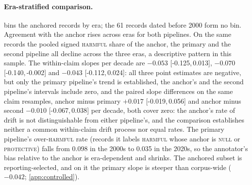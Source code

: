 \documentclass[11pt]{article}
\newcommand{\ci}[2]{[#1,\,#2]}
\begin{document}
\paragraph{Era-stratified comparison.}  bins the anchored records by era; the
61 records dated before 2000 form no bin. Agreement with the anchor rises across eras for both
pipelines. On the same records the pooled signed \textsc{harmful} share of the anchor, the primary
and the second pipeline all decline across the three eras, a descriptive pattern in this sample.
The within-claim slopes per decade are $-0.053$ \ci{-0.125}{0.013}, $-0.070$
\ci{-0.140}{-0.002} and $-0.043$ \ci{-0.112}{0.024}: all three point estimates are negative, but
only the primary pipeline's trend is established, the anchor's and the second pipeline's intervals
include zero, and the paired slope differences on the same claim resamples, anchor minus primary
$+0.017$ \ci{-0.019}{0.056} and anchor minus second $-0.010$ \ci{-0.067}{0.038} per decade, both
cover zero: the anchor's rate of drift is not distinguishable from either pipeline's, and the
comparison establishes neither a common within-claim drift process nor equal rates. The primary pipeline's over-\textsc{harmful} rate (records it
labels \textsc{harmful} whose anchor is \textsc{null} or \textsc{protective}) falls from 0.098 in the
2000s to 0.035 in the 2020s, so the annotator's bias relative to the anchor is era-dependent and
shrinks. The anchored subset is reporting-selected, and on it the primary slope is steeper than
corpus-wide ($-0.042$; \cref{app:controlled}).
\begin{table}[!t]\centering\scriptsize
\setlength{\tabcolsep}{4pt}
\caption{Anchored records by era (61 records before 2000 form no bin). Within-claim slopes of
the \textsc{harmful} share per decade on these records: anchor $-0.053$ \ci{-0.125}{0.013},
primary $-0.070$ \ci{-0.140}{-0.002}, second $-0.043$ \ci{-0.112}{0.024}; paired differences,
anchor minus primary $+0.017$ \ci{-0.019}{0.056}, anchor minus second $-0.010$ \ci{-0.067}{0.038}.}
\label{tab:anchorera}
\end{table}
\end{document}
